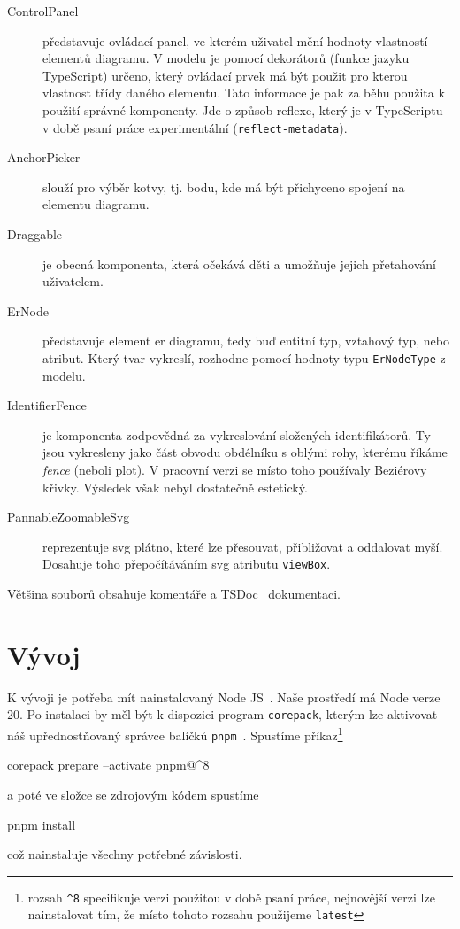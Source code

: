 \begin{description}
  \item[ControlPanel] představuje ovládací panel, ve kterém uživatel mění hodnoty vlastností elementů diagramu.
    V modelu je pomocí dekorátorů (funkce jazyku TypeScript) určeno, který ovládací prvek má být použit pro kterou vlastnost třídy daného elementu.
    Tato informace je pak za běhu použita k použití správné komponenty.
    Jde o způsob reflexe, který je v TypeScriptu v době psaní práce experimentální (\texttt{reflect-metadata}).
  \item[AnchorPicker] slouží pro výběr kotvy, tj. bodu, kde má být přichyceno spojení na elementu diagramu.
  \item[Draggable] je obecná komponenta, která očekává děti a umožňuje jejich přetahování uživatelem.
  \item[ErNode] představuje element \acrshort{er} diagramu, tedy buď entitní typ, vztahový typ, nebo atribut.
    Který tvar vykreslí, rozhodne pomocí hodnoty typu \texttt{ErNodeType} z modelu.
  \item[IdentifierFence] je komponenta zodpovědná za vykreslování složených identifikátorů.
    Ty jsou vykresleny jako část obvodu obdélníku s oblými rohy, kterému říkáme \emph{fence} (neboli plot).
    V pracovní verzi se místo toho používaly Beziérovy křivky.
    Výsledek však nebyl dostatečně estetický.
  \item[PannableZoomableSvg] reprezentuje \acrshort{svg} plátno, které lze přesouvat, přibližovat a oddalovat myší.
    Dosahuje toho přepočítáváním \acrshort{svg} atributu \texttt{viewBox}.
\end{description}

Většina souborů obsahuje komentáře a TSDoc~\cite{microsoft_whattsdoc_} dokumentaci.

\section{Vývoj}\label{section:development}

K vývoji je potřeba mít nainstalovaný Node JS~\cite{openjsfoundation_nodejs_}.
Naše prostředí má Node verze 20.
Po instalaci by měl být k dispozici program \texttt{corepack}, kterým lze aktivovat náš upřednostňovaný správce balíčků \texttt{pnpm}~\cite{pnpm_pnpmfast_}.
Spustíme příkaz\footnote{rozsah \texttt{\^{}8} specifikuje verzi použitou v době psaní práce, nejnovější verzi lze nainstalovat tím, že místo tohoto rozsahu použijeme \texttt{latest}}
\begin{command}
corepack prepare --activate pnpm@^8
\end{command}
a poté ve složce  se zdrojovým kódem spustíme
\begin{command}
pnpm install
\end{command}
což nainstaluje všechny potřebné závislosti.

